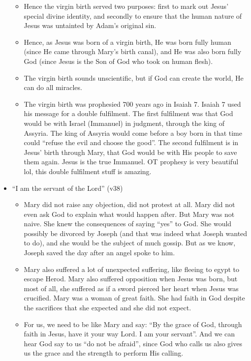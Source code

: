 \begin{itemize}
{\begin{itemize}
    \item{Hence the virgin birth served two purposes: first to mark out Jesus' special divine identity, and secondly to ensure that the human nature of Jesus was untainted by Adam's original sin.}
    \item{Hence, as Jesus was born of a virgin birth, He was born fully human (since He came through Mary's birth canal), and He was also born fully God (since Jesus is the Son of God who took on human flesh).}
    \item{The virgin birth sounds unscientific, but if God can create the world, He can do all miracles.}
    \item{The virgin birth was prophesied 700 years ago in Isaiah 7.  Isaiah
    7 used his message for a double fulfilment.  The first fulfilment was
    that God would be with Israel (Immanuel) in judgment, through the king of
    Assyria.  The king of Assyria would come before a boy born in that time
    could “refuse the evil and choose the good”.  The second fulfilment is in
    Jesus’ birth through Mary, that God would be with His people to save them
    again.  Jesus is the true Immanuel.  OT prophesy is very beautiful lol,
    this double fulfilment stuff is amazing.}
  \end{itemize}}
  \item{``I am the servant of the Lord'' (v38)
  \begin{itemize}
    \item{Mary did not raise any objection, did not protest at all.  Mary did
    not even ask God to explain what would happen after.  But Mary was not
    naive.  She knew the consequences of saying “yes” to God.  She would
    possibly be divorced by Joseph (and that was indeed what Joseph wanted to
    do), and she would be the subject of much gossip.  But as we know, Joseph
    saved the day after an angel spoke to him.}
    \item{Mary also suffered a lot of unexpected suffering, like fleeing to
    egypt to escape Herod.  Mary also suffered opposition when Jesus was
    born, but most of all, she suffered as if a sword pierced her heart when
    Jesus was crucified.  Mary was a woman of great faith.  She had faith in
    God despite the sacrifices that she expected and she did not expect.}
    \item{ For us, we need to be like Mary and say: “By the grace of God,
    through faith in Jesus, have it your way Lord.  I am your servant”.  And
    we can hear God say to us “do not be afraid”, since God who calls us also
    gives us the grace and the strength to perform His calling.  }
  \end{itemize} }
\end{itemize}